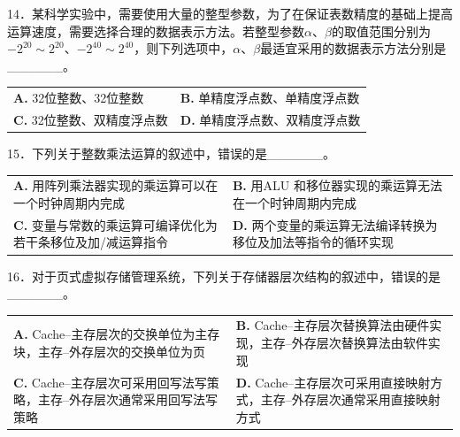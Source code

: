 \documentclass[UTF8,11pt]{ctexart}
\begin{document}
14．某科学实验中，需要使用大量的整型参数，为了在保证表数精度的基础上提高运算速度，需要选择合理的数据表示方法。若整型参数\(\displaystyle \alpha\)、\(\displaystyle \beta\)的取值范围分别为\(\displaystyle -2^{20}\sim2^{20}\)、\(\displaystyle -2^{40}\sim2^{40}\)，则下列选项中，\(\displaystyle \alpha\)、\(\displaystyle \beta\)最适宜采用的数据表示方法分别是\_\_\_\_\_\_。


\begin{center}\begin{tabular}{>{\raggedright\arraybackslash}p{\dimexpr(\linewidth-4\tabcolsep)/2\relax}>{\raggedright\arraybackslash}p{\dimexpr(\linewidth-4\tabcolsep)/2\relax}}
\textbf{A.} 32位整数、32位整数 & \textbf{B.} 单精度浮点数、单精度浮点数\\[.35em]
\textbf{C.} 32位整数、双精度浮点数 & \textbf{D.} 单精度浮点数、双精度浮点数\\[.35em]\end{tabular}\end{center}

15．下列关于整数乘法运算的叙述中，错误的是\_\_\_\_\_\_。


\begin{center}\begin{tabular}{>{\raggedright\arraybackslash}p{\dimexpr(\linewidth-4\tabcolsep)/2\relax}>{\raggedright\arraybackslash}p{\dimexpr(\linewidth-4\tabcolsep)/2\relax}}
\textbf{A.} 用阵列乘法器实现的乘运算可以在一个时钟周期内完成 & \textbf{B.} 用ALU 和移位器实现的乘运算无法在一个时钟周期内完成\\[.35em]
\textbf{C.} 变量与常数的乘运算可编译优化为若干条移位及加/减运算指令 & \textbf{D.} 两个变量的乘运算无法编译转换为移位及加法等指令的循环实现\\[.35em]\end{tabular}\end{center}

16．对于页式虚拟存储管理系统，下列关于存储器层次结构的叙述中，错误的是\_\_\_\_\_\_。


\begin{center}\begin{tabular}{>{\raggedright\arraybackslash}p{\dimexpr(\linewidth-4\tabcolsep)/2\relax}>{\raggedright\arraybackslash}p{\dimexpr(\linewidth-4\tabcolsep)/2\relax}}
\textbf{A.} Cache–主存层次的交换单位为主存块，主存–外存层次的交换单位为页 & \textbf{B.} Cache–主存层次替换算法由硬件实现，主存–外存层次替换算法由软件实现\\[.35em]
\textbf{C.} Cache–主存层次可采用回写法写策略，主存–外存层次通常采用回写法写策略 & \textbf{D.} Cache–主存层次可采用直接映射方式，主存–外存层次通常采用直接映射方式\\[.35em]\end{tabular}\end{center}
\end{document}
